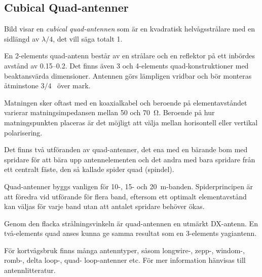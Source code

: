 \subsection{Cubical Quad-antenner}


Bild  visar en \emph{cubical quad-antennen} som är en
kvadratisk helvågsstrålare med en sidlängd av \(\lambda/4\), det vill säga
totalt \SI{1}{\lambda}.

En 2-elements quad-antenn består av en strålare och en reflektor på ett inbördes
avstånd av \SIrange{0,15}{0,2}{\lambda}.
Det finns även 3 och 4-elements quad-konstruktioner med beaktansvärda
dimensioner.
Antennen görs lämpligen vridbar och bör monteras åtminstone $3/4$~\si{\lambda}
över mark.

Matningen sker oftast med en koaxialkabel och beroende på elementavståndet
varierar matningsimpedansen mellan 50 och \SI{70}{\ohm}.
Beroende på hur matningspunkten placeras är det möjligt att välja mellan
horisontell eller vertikal polarisering.

Det finns två utföranden av quad-antenner, det ena med en bärande bom
med spridare för att bära upp antennelementen och det andra med bara
spridare från ett centralt fäste, den så kallade spider quad (spindel).

Quad-antenner byggs vanligen för 10-, 15- och \SI{20}{\metre}-banden.
Spiderprincipen är att föredra vid utförande för flera band, eftersom ett
optimalt element\-avstånd kan väljas för varje band utan att antalet spridare
behöver ökas.

Genom den flacka strålningsvinkeln är quad-\-an\-tennen en utmärkt DX-antenn.
En två-elements quad anses kunna ge samma resultat som en 3-elements yagiantenn.

För kortvågsbruk finns många antenntyper, såsom longwire-, zepp-,
windom-, romb-, delta loop-, quad- loop-antenner etc.
För mer information hänvisas till antennlitteratur.
